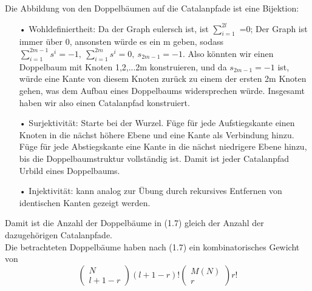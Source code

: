 \documentclass[a4paper, 11pt]{scrreprt}
\newcommand{\NN}{\mathbb{N}}
\begin{document}
Die Abbildung von den Doppelbäumen auf die Catalanpfade ist eine Bijektion:
\begin{itemize}
 \item[•]Wohldefiniertheit: Da der Graph eulersch ist, ist $ \sum_{i=1}^{2l} $ =0; Der Graph ist immer über 0, ansonsten würde es ein m geben, sodass $ \sum_{i=1}^{2m-1}s^{i}=-1, ~\sum_{i=1}^{2m}s^{i}=0, ~ s_{2m-1}=-1  $. Also könnten wir einen Doppelbaum mit Knoten {1,2,...2m} konstruieren, und da $ s_{2m-1}=-1  $ ist, würde eine Kante von diesem Knoten zurück zu einem der ersten 2m Knoten gehen, was dem Aufbau eines Doppelbaums widersprechen würde. Insgesamt haben wir also einen Catalanpfad konstruiert. 
 \item[•] Surjektivität: Starte bei der Wurzel. Füge für jede Aufstiegskante einen Knoten in die nächst höhere Ebene und eine Kante als Verbindung hinzu. Füge für jede Abstiegskante eine Kante in die nächst niedrigere Ebene hinzu, bis die Doppelbaumstruktur vollständig ist. Damit ist jeder Catalanpfad Urbild eines Doppelbaums. 
\item[•] Injektivität: kann analog zur Übung durch rekursives Entfernen von identischen Kanten gezeigt werden.\\
\end{itemize}
Damit ist die Anzahl der Doppelbäume in (1.7) gleich der Anzahl der dazugehörigen Catalanpfade.\\
Die betrachteten Doppelbäume haben nach (1.7) ein kombinatorisches Gewicht von 
	\begin{equation}
		\begin{pmatrix} N\\ l+1-r\end{pmatrix} (l+1-r)! \begin{pmatrix} M(N)\\r\end{pmatrix} r!
	\end{equation}
\end{document}
